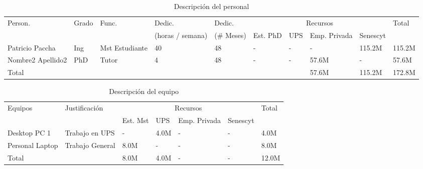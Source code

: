 \documentclass[12pt,a4paper]{article}
\begin{document}
\begin{table}[ht!]
\caption{Descripción del personal}
\begin{tabular}{|p{1.1cm}|p{1.1cm}|p{1.1cm}|p{1.1cm}|p{1.3cm}|p{1.1cm}|p{1.1cm}|p{1.1cm}|p{1.1cm}|p{1.1cm}|} \hline
Person. & Grado & Func. & Dedic.  & Dedic.  & \multicolumn{4}{|c|}{Recursos} & Total \\ \cline{6-9}
  &   &   & (horas / semana)  &  (\# Meses) & Est. PhD  & UPS & Emp. Privada & Senescyt &  \\ \hline \hline
  Patricio Paccha  & Ing  & Mst Estudiante  & 40 & 48 & - & - & - & 115.2M & 115.2M \\ \hline
  Nombre2 Apellido2  & PhD  & Tutor & 4 & 48 & - & - & 57.6M & - & 57.6M \\ \hline
Total &    &   &   &   &   &   & 57.6M &  115.2M & 172.8M \\ \hline
\end{tabular}
\end{table}

\begin{table}[ht!]
\caption{Descripción del equipo}
\begin{tabular}{|p{3.4cm}|p{3.4cm}|p{1.1cm}|p{1.1cm}|p{1.1cm}|p{1.1cm}|p{1.1cm}|} \hline
Equipos & Justificación & \multicolumn{4}{|c|}{Recursos} & Total \\ \cline{3-6}
 &   & Est. Mst & UPS & Emp. Privada & Senescyt &  \\ \hline \hline
Desktop PC 1 & Trabajo en UPS  & - & 4.0M & - & - & 4.0M \\ \hline
Personal Laptop & Trabajo General & 8.0M & - & - & - & 8.0M \\ \hline
Total &    & 8.0M & 4.0M & - & - & 12.0M \\ \hline
\end{tabular}
\end{table}
\end{document}
